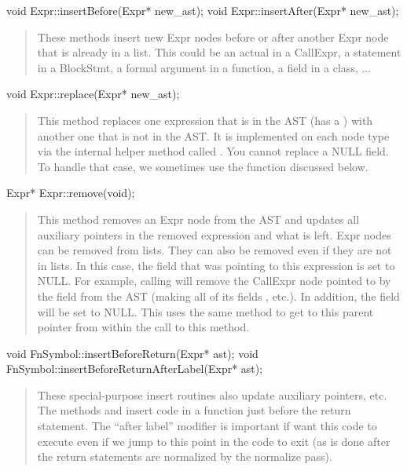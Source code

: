 \documentclass[10pt]{article}
\begin{document}
\begin{clang}
void Expr::insertBefore(Expr* new_ast);
void Expr::insertAfter(Expr* new_ast);
\end{clang}
\begin{quote}
These methods insert new Expr nodes before or after another Expr node
that is already in a list.  This could be an actual in a CallExpr, a
statement in a BlockStmt, a formal argument in a function, a field in
a class, ...
\end{quote}

\begin{clang}
void Expr::replace(Expr* new_ast);
\end{clang}
\begin{quote}
This method replaces one expression that is in the AST (has a
) with another one that is not in the AST.  It is
implemented on each node type via the internal helper method called
.  You cannot replace a NULL field.  To handle
that case, we sometimes use the  function discussed
below.
\end{quote}

\begin{clang}
Expr* Expr::remove(void);
\end{clang}
\begin{quote}
This method removes an Expr node from the AST and updates all auxiliary
pointers in the removed expression and what is left.
Expr nodes can be removed from lists.  They can also be removed even
if they are not in lists.  In this case, the field that was pointing
to this expression is set to NULL.  For example, calling
 will remove the CallExpr node pointed
to by the  field from the AST (making all of its
 fields , etc.).  In addition, the
 field will be set to NULL.  This uses the same
 method to get to this parent pointer from within the
call to this method.
\end{quote}

\begin{clang}
void FnSymbol::insertBeforeReturn(Expr* ast);
void FnSymbol::insertBeforeReturnAfterLabel(Expr* ast);
\end{clang}
\begin{quote}
These special-purpose insert routines also update auxiliary pointers, etc.
The methods  and
 insert code in a function just
before the return statement.  The ``after label'' modifier is
important if want this code to execute even if we jump to this point
in the code to exit (as is done after the return statements are
normalized by the normalize pass).
\end{quote}
\end{document}
